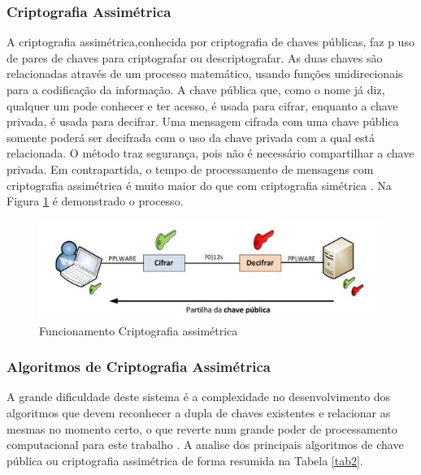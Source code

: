 \documentclass[12pt]{article}
\begin{document}
\subsubsection{Criptografia Assimétrica}

A  criptografia assimétrica,conhecida  por  criptografia de  chaves  públicas, faz p  uso  de  pares  de  chaves  para criptografar ou descriptografar. As duas chaves  são  relacionadas  através  de  um  processo  matemático, usando  funções  unidirecionais para a codificação da informação. A chave pública que, como o nome já diz, qualquer um pode conhecer e ter acesso, é usada para cifrar, enquanto a chave privada, é usada para decifrar. Uma mensagem cifrada com uma chave pública somente poderá ser decifrada com o uso da chave privada com a qual está  relacionada. O método  traz segurança, pois não é necessário compartilhar a chave privada. Em contrapartida, o tempo de processamento de mensagens com criptografia assimétrica é muito maior do que com criptografia simétrica \cite{BURNETT:02}. 
Na Figura \ref{cripto2} é demonstrado o processo.

 \begin{figure}[h!]
	\centering
	\includegraphics[]{assimetrica.JPG}
	\caption{Funcionamento Criptografia assimétrica}
	\label{cripto2}
\end{figure}

\subsubsection{Algoritmos de Criptografia Assimétrica}

A grande dificuldade deste sistema é a  complexidade  no  desenvolvimento  dos algoritmos que devem reconhecer a dupla de chaves existentes e relacionar as  mesmas  no  momento  certo,  o  que reverte num  grande  poder  de  processamento computacional para este trabalho \cite{STALLINGS:14}. A  analise  dos  principais  algoritmos  de  chave pública ou criptografia assimétrica de forma resumida na Tabela \ref{tab2}.
\end{document}
